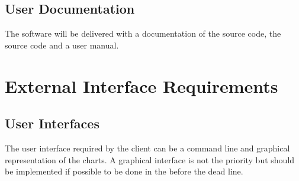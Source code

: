 \documentclass{scrreprt}
\begin{document}
\section{User Documentation}
The software will be delivered with a documentation of the source code, the
source code and a user manual.



\chapter{External Interface Requirements}

\section{User Interfaces}
The user interface required by the client can be a command line and
graphical representation of the charts.
A graphical interface is not the priority but should be implemented if possible
to be done in the before the dead line.

\end{document}
